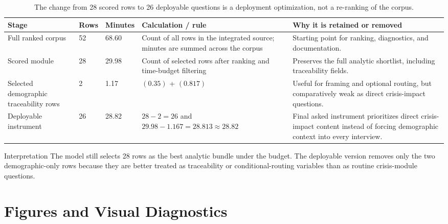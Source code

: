 \documentclass[12pt]{article}
\begin{document}
\begin{table}[H]
\centering
\footnotesize
\begin{tabularx}{\textwidth}{L{0.20\textwidth} R{0.08\textwidth} R{0.10\textwidth} Y Y}
\toprule
Stage & Rows & Minutes & Calculation / rule & Why it is retained or removed \\
\midrule
Full ranked corpus & 52 & 68.60 & Count of all rows in the integrated source; minutes are summed across the corpus & Starting point for ranking, diagnostics, and documentation. \\
Scored module & 28 & 29.98 & Count of selected rows after ranking and time-budget filtering & Preserves the full analytic shortlist, including traceability fields. \\
Selected demographic traceability rows & 2 & 1.17 &  $(0.35)$ +  $(0.817)$ & Useful for framing and optional routing, but comparatively weak as direct crisis-impact questions. \\
Deployable instrument & 26 & 28.82 & $28 - 2 = 26$ and $29.98 - 1.167 = 28.813 \approx 28.82$ & Final asked instrument prioritizes direct crisis-impact content instead of forcing demographic context into every interview. \\
\bottomrule
\end{tabularx}
\caption{The change from 28 scored rows to 26 deployable questions is a deployment optimization, not a re-ranking of the corpus.}
\end{table}

\begin{psidbox}{Interpretation}
The model still selects 28 rows as the best analytic bundle under the budget. The deployable version removes only the two demographic-only rows because they are better treated as traceability or conditional-routing variables than as routine crisis-module questions.
\end{psidbox}

\section{Figures and Visual Diagnostics}
\end{document}
